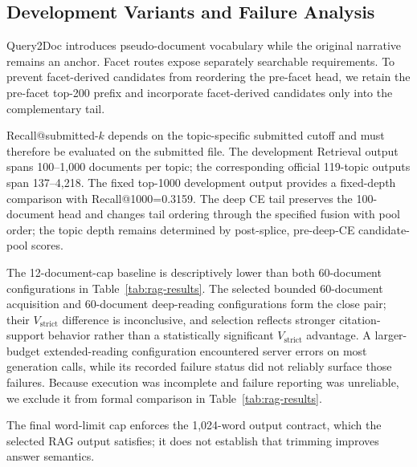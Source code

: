 \subsection{Development Variants and Failure Analysis}
\label{sec:ablations}

Query2Doc introduces pseudo-document vocabulary while the original
narrative remains an anchor. Facet routes expose separately searchable
requirements. To prevent facet-derived candidates from reordering the
pre-facet head, we retain the pre-facet top-200 prefix and incorporate
facet-derived candidates only into the complementary tail.

Recall@submitted-$k$ depends on the topic-specific submitted cutoff and
must therefore be evaluated on the submitted file. The development Retrieval
output spans 100--1,000 documents per topic; the corresponding official
119-topic outputs span 137--4,218. The fixed top-1000 development output provides
a fixed-depth comparison with Recall@1000=0.3159. The deep CE tail
preserves the 100-document head and changes tail ordering through the
specified fusion with pool order; the topic depth remains determined by
post-splice, pre-deep-CE candidate-pool scores.

The 12-document-cap baseline is descriptively lower than both
60-document configurations in Table~\ref{tab:rag-results}. The selected
bounded 60-document acquisition and 60-document deep-reading
configurations form the close pair;
their $V_{\mathrm{strict}}$ difference is inconclusive, and selection reflects stronger
citation-support behavior rather than a statistically significant
$V_{\mathrm{strict}}$ advantage. A
larger-budget extended-reading configuration encountered server errors
on most generation calls, while its recorded failure status did not
reliably surface those failures. Because execution was incomplete and
failure reporting was unreliable, we exclude it from formal comparison
in Table~\ref{tab:rag-results}.

The final word-limit cap enforces the 1,024-word output contract, which
the selected RAG output satisfies; it does not establish that trimming
improves answer semantics.
